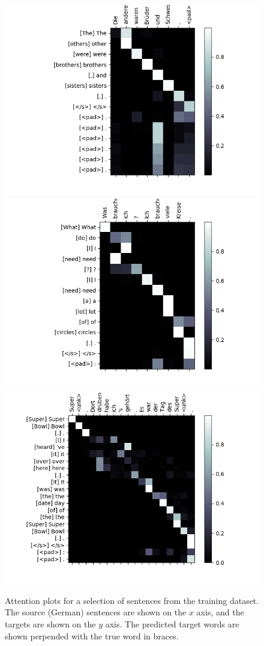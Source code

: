 \documentclass[11pt]{article}
\begin{document}
\begin{figure}[H]
\begin{center}
		\includegraphics[scale=0.5]{attn_3}
		\includegraphics[scale=0.5]{attn_4}
		\includegraphics[scale=0.5]{attn_5}
		\label{fig:attn}
		\caption{Attention plots for a selection of sentences from the training dataset. The source (German) sentences are shown on the $x$ axis, and the targets are shown on the $y$ axis. The predicted target words are shown perpended with the true word in braces.}
	\end{center} 
\end{figure}
\end{document}
